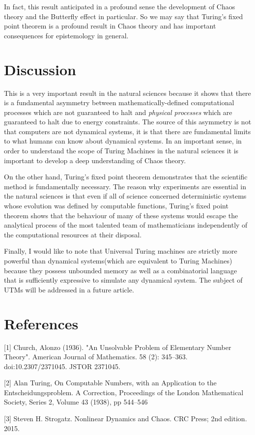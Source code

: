 \documentclass{article}
\begin{document}
In fact, this result anticipated in a profound sense the development of Chaos theory and the Butterfly effect in particular.
So we may say that Turing's fixed point theorem is a profound result in Chaos theory and has important consequences for epistemology in general.

\newpage

\section{Discussion}

This is a very important result in the natural sciences because it shows that there is a fundamental asymmetry between mathematically-defined computational processes which are not guaranteed to halt and \textit{physical processes} which are guaranteed to halt due to energy constraints. The source of this
asymmetry is not that computers are not dynamical systems, it is that there are fundamental limits to what humans can know about dynamical systems. In an important sense, in order to understand the scope of Turing Machines in the natural sciences it is important to develop a deep understanding of Chaos theory.

On the other hand, Turing's fixed point theorem demonstrates that the scientific method is fundamentally necessary.
The reason why experiments are essential in the natural sciences is that even if all of science concerned deterministic
systems whose evolution was defined by computable functions, Turing's fixed point theorem shows that the behaviour
of many of these systems would escape the analytical process of the most talented team of mathematicians independently
of the computational resources at their disposal. 

Finally, I would like to note that Universal Turing machines are strictly more powerful than dynamical systems(which are equivalent to Turing Machines) because they possess unbounded memory as well as a combinatorial language that is sufficiently expressive to simulate any dynamical system. The subject of UTMs will be addressed in a future article.

\section*{References}

\small

[1] Church, Alonzo (1936). "An Unsolvable Problem of Elementary Number Theory". American Journal of Mathematics. 58 (2): 345–363. doi:10.2307/2371045. JSTOR 2371045.

[2] Alan Turing, On Computable Numbers, with an Application to the Entscheidungsproblem. A Correction, Proceedings of the London Mathematical Society, Series 2, Volume 43 (1938), pp 544–546 

[3] Steven H. Strogatz. Nonlinear Dynamics and Chaos. CRC Press; 2nd edition. 2015.
\end{document}
